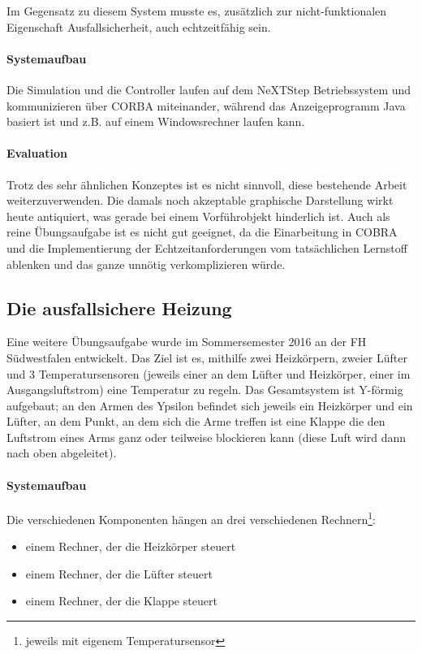 \documentclass[
    12pt,
    bibliography=totoc,
    ngerman,
	enabledeprecatedfontcommands
]{scrartcl}
\begin{document}
Im Gegensatz zu diesem System musste es, zus{\"{a}}tzlich zur nicht-funktionalen Eigenschaft Ausfallsicherheit, auch echtzeitf{\"{a}}hig sein.

\paragraph{Systemaufbau} Die Simulation und die Controller laufen auf dem NeXTStep Betriebssystem und kommunizieren {\"{u}}ber CORBA miteinander\cite{predictablecorba}, w{\"{a}}hrend
das Anzeigeprogramm Java basiert ist und z.B. auf einem Windowsrechner laufen kann.


\paragraph{Evaluation} Trotz des sehr {\"{a}}hnlichen Konzeptes ist es nicht sinnvoll, diese bestehende Arbeit weiterzuverwenden.
Die damals noch akzeptable graphische Darstellung wirkt heute antiquiert, was gerade bei einem Vorf{\"{u}}hrobjekt hinderlich
ist. Auch als reine {\"{U}}bungsaufgabe ist es nicht gut geeignet, da die Einarbeitung in COBRA und die Implementierung der
Echtzeitanforderungen vom tats{\"{a}}chlichen Lernstoff ablenken und das ganze unn{\"{o}}tig verkomplizieren w{\"{u}}rde.

\subsection{Die ausfallsichere Heizung}
Eine weitere {\"{U}}bungsaufgabe wurde im Sommersemester 2016 an der FH S{\"{u}}dwestfalen entwickelt. Das Ziel ist es, mithilfe zwei Heizk{\"{o}}rpern, zweier
L{\"{u}}fter und 3 Temperatursensoren (jeweils einer an dem L{\"{u}}fter und Heizk{\"{o}}rper, einer im Ausgangsluftstrom) eine Temperatur zu regeln.
Das Gesamtsystem ist Y-f{\"{o}}rmig aufgebaut; an den Armen des Ypsilon befindet sich jeweils ein Heizk{\"{o}}rper und ein L{\"{u}}fter, an dem Punkt, an dem sich
die Arme treffen ist eine Klappe die den Luftstrom eines Arms ganz oder teilweise blockieren kann (diese Luft wird dann nach oben abgeleitet).

\paragraph{Systemaufbau} Die verschiedenen Komponenten h{\"{a}}ngen an drei verschiedenen Rechnern\footnote{jeweils mit eigenem Temperatursensor}:
\begin{itemize}
\item einem Rechner, der die Heizk{\"{o}}rper steuert
\item einem Rechner, der die L{\"{u}}fter steuert
\item einem Rechner, der die Klappe steuert
\end{itemize}
\end{document}
